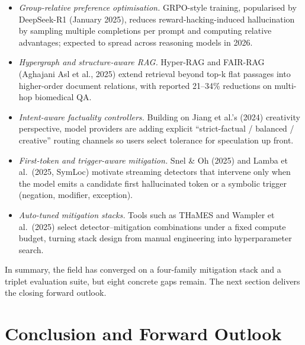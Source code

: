 \documentclass{article}
\begin{document}
\begin{itemize}

\item
  \emph{Group-relative preference optimisation.} GRPO-style training, popularised by DeepSeek-R1 (January 2025), reduces reward-hacking-induced hallucination by sampling multiple completions per prompt and computing relative advantages; expected to spread across reasoning models in 2026.
\item
  \emph{Hypergraph and structure-aware RAG.} Hyper-RAG \citep{feng2026hyperragcombatingl} and FAIR-RAG (Aghajani Asl et al., 2025) extend retrieval beyond top-k flat passages into higher-order document relations, with reported 21--34\% reductions on multi-hop biomedical QA.
\item
  \emph{Intent-aware factuality controllers.} Building on Jiang et al.'s (2024) creativity perspective, model providers are adding explicit ``strict-factual / balanced / creative'' routing channels so users select tolerance for speculation up front.
\item
  \emph{First-token and trigger-aware mitigation.} Snel \& Oh (2025) and Lamba et al.~(2025, SymLoc) motivate streaming detectors that intervene only when the model emits a candidate first hallucinated token or a symbolic trigger (negation, modifier, exception).
\item
  \emph{Auto-tuned mitigation stacks.} Tools such as THaMES \citep{liang2024uhgevalbenchmarkin} and Wampler et al.~(2025) select detector--mitigation combinations under a fixed compute budget, turning stack design from manual engineering into hyperparameter search.
\end{itemize}

In summary, the field has converged on a four-family mitigation stack and a triplet evaluation suite, but eight concrete gaps remain. The next section delivers the closing forward outlook.

\section{Conclusion and Forward Outlook}\label{conclusion-and-forward-outlook}
\end{document}
